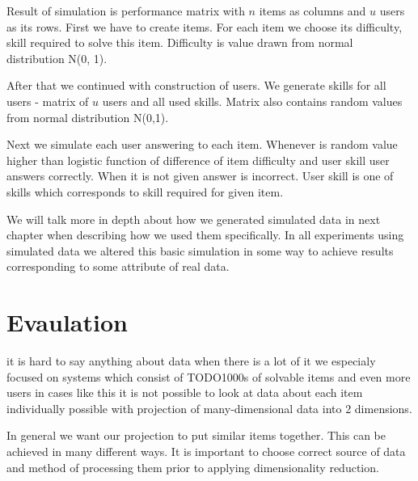 \documentclass[
  digital, %
  table,   %
  nolof,     %
  nolot,     %
  nocover
]{fithesis3}
\begin{document}
Result of simulation is performance matrix with $n$ items as columns and $u$ users as its rows. First we have to create items. For each item we choose its difficulty, skill required to solve this item. Difficulty is value drawn from normal distribution N(0, 1).

After that we continued with construction of users. We generate skills for all users - matrix of $u$ users and all used skills. Matrix also contains random values from normal distribution N(0,1).

Next we simulate each user answering to each item. Whenever is random value higher than logistic function of difference of item difficulty and user skill user answers correctly. When it is not given answer is incorrect. User skill is one of skills which corresponds to skill required for given item.

We will talk more in depth about how we generated simulated data in next chapter when describing how we used them specifically. In all experiments using simulated data we altered this basic simulation in some way to achieve results corresponding to some attribute of real data.

\section{Evaulation}\label{evaulation}




it is hard to say anything about data when there is a lot of it we
especialy focused on systems which consist of TODO1000s of solvable
items and even more users in cases like this it is not possible to look
at data about each item individually possible with projection of
many-dimensional data into 2 dimensions.


In general we want our projection to put similar items together. This
can be achieved in many different ways. It is important to choose
correct source of data and method of processing them prior to applying
dimensionality reduction.

\end{document}
